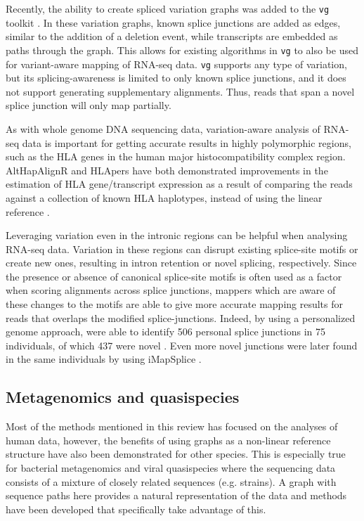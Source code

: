 Recently, the ability to create spliced variation graphs was added to the \texttt{vg} toolkit \cite{Garrison_2018}. 
In these variation graphs, known splice junctions are added as edges, similar to the addition of a deletion event, while transcripts are embedded as paths through the graph. 
This allows for existing algorithms in \texttt{vg} to also be used for variant-aware mapping of RNA-seq data. 
\texttt{vg} supports any type of variation, but its splicing-awareness is limited to only known splice junctions, and it does not support generating supplementary alignments.
Thus, reads that span a novel splice junction will only map partially.

As with whole genome DNA sequencing data, variation-aware analysis of RNA-seq data is important for getting accurate results in highly polymorphic regions, such as the HLA genes in the human major histocompatibility complex region. 
AltHapAlignR and HLApers have both demonstrated improvements in the estimation of HLA gene/transcript expression as a result of comparing the reads against a collection of known HLA haplotypes, instead of using the linear reference \cite{Lee_2018,Aguiar2019-fy}.

Leveraging variation even in the intronic regions can be helpful when analysing RNA-seq data. 
Variation in these regions can disrupt existing splice-site motifs or create new ones, resulting in intron retention or novel splicing, respectively. 
Since the presence or absence of canonical splice-site motifs is often used as a factor when scoring alignments across splice junctions, mappers which are aware of these changes to the motifs are able to give more accurate mapping results for reads that overlaps the modified splice-junctions. 
Indeed, by using a personalized genome approach, \citeauthor{Stein_2015} were able to identify 506 personal splice junctions in 75 individuals, of which 437 were novel \cite{Stein_2015}.
Even more novel junctions were later found in the same individuals by \citeauthor{Liu_2018} using iMapSplice \cite{Liu_2018}.

\subsection{Metagenomics and quasispecies}

Most of the methods mentioned in this review has focused on the analyses of human data, however, the benefits of using graphs as a non-linear reference structure have also been demonstrated for other species.
This is especially true for bacterial metagenomics and viral quasispecies where the sequencing data consists of a mixture of closely related sequences (e.g. strains).
A graph with sequence paths here provides a natural representation of the data and methods have been developed that specifically take advantage of this. 

